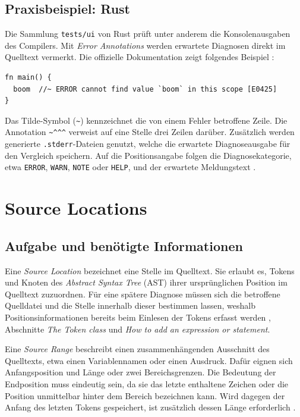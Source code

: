 \documentclass[11pt,a4paper]{article}
\begin{document}
\subsection{Praxisbeispiel: Rust}

Die Sammlung \texttt{tests/ui} von Rust prüft unter anderem die Konsolenausgaben des Compilers. Mit \emph{Error Annotations} werden erwartete Diagnosen direkt im Quelltext vermerkt. Die offizielle Dokumentation zeigt folgendes Beispiel \parencite{rust_ui_tests}:

\begin{lstlisting}[caption={Originalbeispiel für eine Rust-Fehlerannotation}]
fn main() {
  boom  //~ ERROR cannot find value `boom` in this scope [E0425]
}
\end{lstlisting}

Das Tilde-Symbol (\texttt{\textasciitilde}) kennzeichnet die von einem Fehler betroffene Zeile. Die Annotation \texttt{\textasciitilde\textasciicircum\textasciicircum\textasciicircum} verweist auf eine Stelle drei Zeilen darüber. Zusätzlich werden generierte \texttt{.stderr}-Dateien genutzt, welche die erwartete Diagnoseausgabe für den Vergleich speichern. Auf die Positionsangabe folgen die Diagnosekategorie, etwa \texttt{ERROR}, \texttt{WARN}, \texttt{NOTE} oder \texttt{HELP}, und der erwartete Meldungstext \parencite{rust_ui_tests}.

\section{Source Locations}
\subsection{Aufgabe und benötigte Informationen}
Eine \emph{Source Location} bezeichnet eine Stelle im Quelltext. Sie erlaubt es, Tokens und Knoten des \emph{Abstract Syntax Tree} (AST) ihrer ursprünglichen Position im Quelltext zuzuordnen. Für eine spätere Diagnose müssen sich die betroffene Quelldatei und die Stelle innerhalb dieser bestimmen lassen, weshalb Positionsinformationen bereits beim Einlesen der Tokens erfasst werden \parencite{clang}, Abschnitte \emph{The Token class} und \emph{How to add an expression or statement}.

Eine \emph{Source Range} beschreibt einen zusammenhängenden Ausschnitt des Quelltexts, etwa einen Variablennamen oder einen Ausdruck. Dafür eignen sich Anfangsposition und Länge oder zwei Bereichsgrenzen. Die Bedeutung der Endposition muss eindeutig sein, da sie das letzte enthaltene Zeichen oder die Position unmittelbar hinter dem Bereich bezeichnen kann. Wird dagegen der Anfang des letzten Tokens gespeichert, ist zusätzlich dessen Länge erforderlich \parencite{clang,sourcelocation}.
\end{document}
